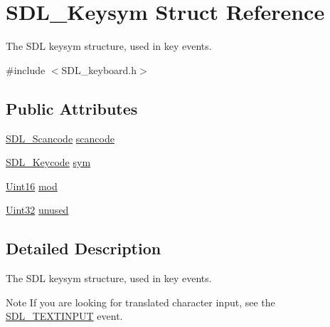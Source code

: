 \hypertarget{struct_s_d_l___keysym}{\section{S\-D\-L\-\_\-\-Keysym Struct Reference}
\label{struct_s_d_l___keysym}
}


The S\-D\-L keysym structure, used in key events.  




{\ttfamily \#include $<$S\-D\-L\-\_\-keyboard.\-h$>$}

\subsection*{Public Attributes}
\begin{DoxyCompactItemize}
\item 
\hyperlink{_s_d_l__scancode_8h_a82ab7cff701034fb40a47b5b3a02777b}{S\-D\-L\-\_\-\-Scancode} \hyperlink{struct_s_d_l___keysym_ad47e9120a511e2efc7ec0c6d8a5ec51e}{scancode}
\item 
\hyperlink{_s_d_l__keycode_8h_ae9265f064f13f0f74dfca26a67875171}{S\-D\-L\-\_\-\-Keycode} \hyperlink{struct_s_d_l___keysym_a082ff1fd787b79fa6c3a445deb225f08}{sym}
\item 
\hyperlink{_s_d_l__stdinc_8h_a31fcc0a076c9068668173ee26d33e42b}{Uint16} \hyperlink{struct_s_d_l___keysym_ab519d1b8a9939d3d035f7103f3208291}{mod}
\item 
\hyperlink{_s_d_l__stdinc_8h_add440eff171ea5f55cb00c4a9ab8672d}{Uint32} \hyperlink{struct_s_d_l___keysym_ab1d0a50cc619966fb06b92e15cc46dd9}{unused}
\end{DoxyCompactItemize}


\subsection{Detailed Description}
The S\-D\-L keysym structure, used in key events. 

\begin{DoxyNote}{Note}
If you are looking for translated character input, see the \hyperlink{_s_d_l__events_8h_a3b589e89be6b35c02e0dd34a55f3fccaa4fa2570088f6b9cbd109ae91b511368f}{S\-D\-L\-\_\-\-T\-E\-X\-T\-I\-N\-P\-U\-T} event. 
\end{DoxyNote}


